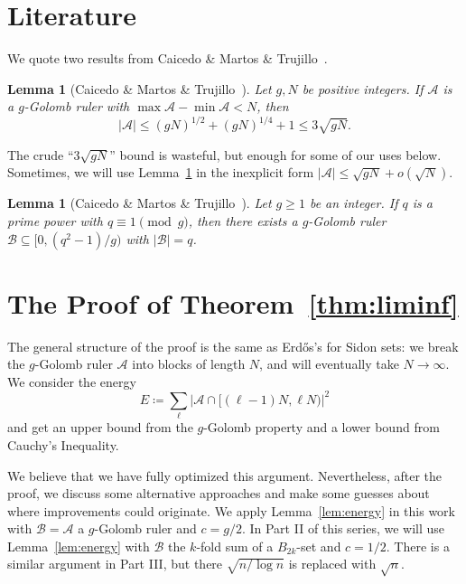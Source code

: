 \documentclass[10pt]{article}
\newcommand{\cA}{\mathcal{A}}
\newcommand{\cB}{\mathcal{B}}
\newtheorem{lem}[thm]{Lemma}
\begin{document}
\section{Literature}\label{sec:literature}
We quote two results from Caicedo \& Martos \& Trujillo~\cite{2015.Caicedo&Martos&Trujillo}.
\begin{lem}[Caicedo \& Martos \& Trujillo~\cite{2015.Caicedo&Martos&Trujillo}]
  \label{lem:finite upper}
  Let $g ,N$ be positive integers. If $\cA$ is a $g$-Golomb ruler with $\max\cA-\min\cA < N$, then 
    \[|\cA| \le (g N)^{1/2}+(g N)^{1/4}+1\le 3\sqrt{g N}.\]
\end{lem}
The crude ``$3\sqrt{g N}$'' bound is wasteful, but enough for some of our uses below. Sometimes, we will use Lemma~\ref{lem:finite upper} in the inexplicit form $|\cA| \le \sqrt{g N} + o(\sqrt N)$.

\begin{lem}[Caicedo \& Martos \& Trujillo~\cite{2015.Caicedo&Martos&Trujillo}]
    \label{lem:finite lower}
    Let $g \ge 1$ be an integer. If $q$ is a prime power with $q\equiv 1 \pmod{g }$, then there exists a $g$-Golomb ruler $\cB\subseteq[0,(q^2-1)/g )$ with $|\cB|=q$.
\end{lem}

\section{The Proof of Theorem~\ref{thm:liminf}}\label{sec:Proof of liminf}
The general structure of the proof is the same as Erd\H{o}s's for Sidon sets: we break the $g$-Golomb ruler $\cA$ into blocks of length $N$, and will eventually take $N\to\infty$. We consider the energy
    \[ E \coloneqq \sum_\ell \left| \cA \cap [(\ell-1)N,\ell N) \right|^2\]
and get an upper bound from the $g$-Golomb property and a lower bound from Cauchy's Inequality.

We believe that we have fully optimized this argument. Nevertheless, after the proof, we discuss some alternative approaches and make some guesses about where improvements could originate. We apply Lemma~\ref{lem:energy} in this work with $\cB=\cA$ a $g$-Golomb ruler and $c=g/2$. In Part II of this series, we will use Lemma~\ref{lem:energy} with $\cB$ the $k$-fold sum of a $B_{2k}$-set and $c=1/2$. There is a similar argument in Part III, but there $\sqrt{n/\log n}$ is replaced with $\sqrt{n}$.
\end{document}
